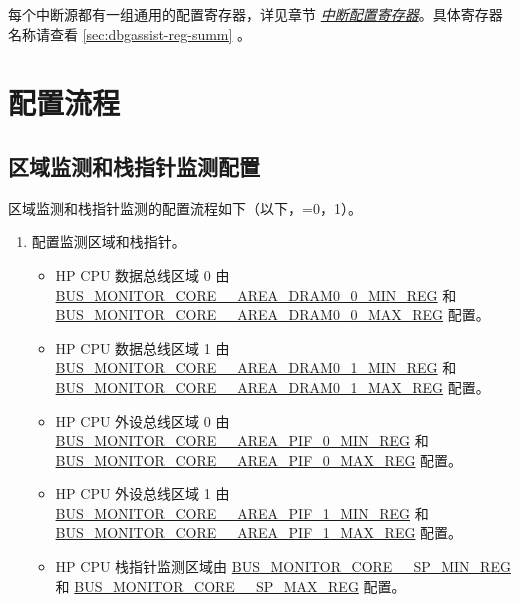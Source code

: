 \documentclass[main\_\_CN.tex]{subfiles}
\begin{document}
每个中断源都有一组通用的配置寄存器，详见章节 \hyperref[interrupt-config-registers]{\textit{中断配置寄存器}}。具体寄存器名称请查看 \ref{sec:dbgassist-reg-summ} \textit{}。


\section{配置流程}
\label{sec:dbgassist-prog-procedures}

\subsection{区域监测和栈指针监测配置}

区域监测和栈指针监测的配置流程如下（以下，=0，1）。

\begin{enumerate}
    \item 配置监测区域和栈指针。
        \begin{itemize}
            \item HP CPU 数据总线区域 0 由 \hyperref[regdesc:BUSMONITORCORE0AREADRAM00MINREG]{BUS\_MONITOR\_CORE\_\_AREA\_DRAM0\_0\_MIN\_REG} 和 \hyperref[regdesc:BUSMONITORCORE0AREADRAM00MAXREG]{BUS\_MONITOR\_CORE\_\_AREA\_DRAM0\_0\_MAX\_REG} 配置。
            \item HP CPU 数据总线区域 1 由 \hyperref[regdesc:BUSMONITORCORE0AREADRAM01MINREG]{BUS\_MONITOR\_CORE\_\_AREA\_DRAM0\_1\_MIN\_REG} 和 \hyperref[regdesc:BUSMONITORCORE0AREADRAM01MAXREG]{BUS\_MONITOR\_CORE\_\_AREA\_DRAM0\_1\_MAX\_REG} 配置。
            \item HP CPU 外设总线区域 0 由 \hyperref[regdesc:BUSMONITORCORE0AREAPIF0MINREG]{BUS\_MONITOR\_CORE\_\_AREA\_PIF\_0\_MIN\_REG} 和 \hyperref[regdesc:BUSMONITORCORE0AREAPIF0MAXREG]{BUS\_MONITOR\_CORE\_\_AREA\_PIF\_0\_MAX\_REG} 配置。
            \item HP CPU 外设总线区域 1 由 \hyperref[regdesc:BUSMONITORCORE0AREAPIF1MINREG]{BUS\_MONITOR\_CORE\_\_AREA\_PIF\_1\_MIN\_REG} 和 \hyperref[regdesc:BUSMONITORCORE0AREAPIF1MAXREG]{BUS\_MONITOR\_CORE\_\_AREA\_PIF\_1\_MAX\_REG} 配置。
            \item HP CPU 栈指针监测区域由 \hyperref[regdesc:BUSMONITORCORE0SPMINREG]{BUS\_MONITOR\_CORE\_\_SP\_MIN\_REG} 和 \hyperref[regdesc:BUSMONITORCORE0SPMAXREG]{BUS\_MONITOR\_CORE\_\_SP\_MAX\_REG} 配置。

\end{itemize}
\end{enumerate}
\end{document}

